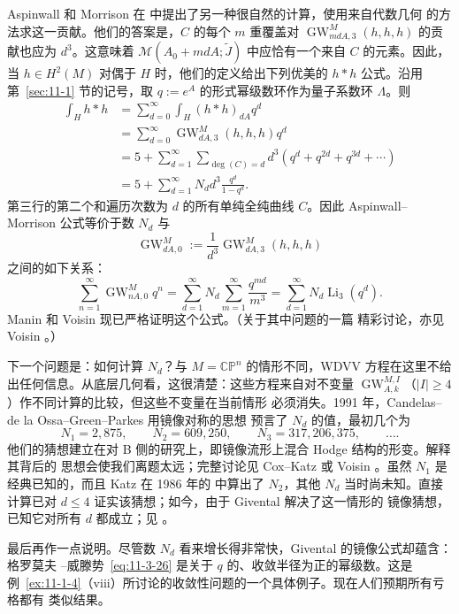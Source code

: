 Aspinwall 和 Morrison 在  中提出了另一种很自然的计算，使用来自代数几何
的方法求这一贡献。他们的答案是，$C$ 的每个 $m$ 重覆盖对
$\operatorname{GW}_{mdA,3}^M(h,h,h)$ 的贡献也应为 $d^3$。这意味着
$\mathcal M(A_0+mdA;\widetilde J)$ 中应恰有一个来自 $C$ 的元素。因此，当
$h\in H^2(M)$ 对偶于 $H$ 时，他们的定义给出下列优美的 $h*h$ 公式。沿用
第~\ref{sec:11-1} 节的记号，取 $q:=e^A$ 的形式幂级数环作为量子系数环 $\Lambda$。则
\begin{align*}
  \int_Hh*h
  &=\sum_{d=0}^\infty\int_H(h*h)_{dA}q^d\\
  &=\sum_{d=0}^\infty\operatorname{GW}_{dA,3}^M(h,h,h)q^d\\
  &=5+\sum_{d=1}^\infty\sum_{\deg(C)=d}
    d^3(q^d+q^{2d}+q^{3d}+\cdots)\\
  &=5+\sum_{d=1}^\infty N_dd^3\frac{q^d}{1-q^d}.
\end{align*}
第三行的第二个和遍历次数为 $d$ 的所有单纯全纯曲线 $C$。因此 Aspinwall--Morrison
公式等价于数 $N_d$ 与
\[
  \operatorname{GW}_{dA,0}^M:=\frac1{d^3}
  \operatorname{GW}_{dA,3}^M(h,h,h)
\]
之间的如下关系：
\begin{equation}\label{eq:11-3-26}
  \sum_{n=1}^\infty\operatorname{GW}_{nA,0}^M q^n
  =\sum_{d=1}^\infty N_d\sum_{m=1}^\infty\frac{q^{md}}{m^3}
  =\sum_{d=1}^\infty N_d\operatorname{Li}_3(q^d).
\end{equation}
Manin  和 Voisin  现已严格证明这个公式。（关于其中问题的一篇
精彩讨论，亦见 Voisin 。）

下一个问题是：如何计算 $N_d$？与 $M=\mathbb{CP}^n$ 的情形不同，WDVV 方程在这里不给
出任何信息。从底层几何看，这很清楚：这些方程来自对不变量
$\operatorname{GW}_{A,k}^{M,I}$（$|I|\geq4$）作不同计算的比较，但这些不变量在当前情形
必须消失。1991 年，Candelas--de la Ossa--Green--Parkes  用镜像对称的思想
预言了 $N_d$ 的值，最初几个为
\[
  N_1=2{,}875,\qquad
  N_2=609{,}250,\qquad
  N_3=317{,}206{,}375,\qquad\ldots.
\]
他们的猜想建立在对 B 侧的研究上，即镜像流形上混合 Hodge 结构的形变。解释其背后的
思想会使我们离题太远；完整讨论见 Cox--Katz  或 Voisin 。虽然
$N_1$ 是经典已知的，而且 Katz 在 1986 年的  中算出了 $N_2$，其他 $N_d$
当时尚未知。直接计算已对 $d\leq4$ 证实该猜想；如今，由于 Givental 解决了这一情形的
镜像猜想，已知它对所有 $d$ 都成立；见 。

最后再作一点说明。尽管数 $N_d$ 看来增长得非常快，Givental 的镜像公式却蕴含：格罗莫夫
--威滕势~\eqref{eq:11-3-26} 是关于 $q$ 的、收敛半径为正的幂级数。这是
例~\ref{ex:11-1-4}（viii）所讨论的收敛性问题的一个具体例子。现在人们预期所有亏格都有
类似结果。

